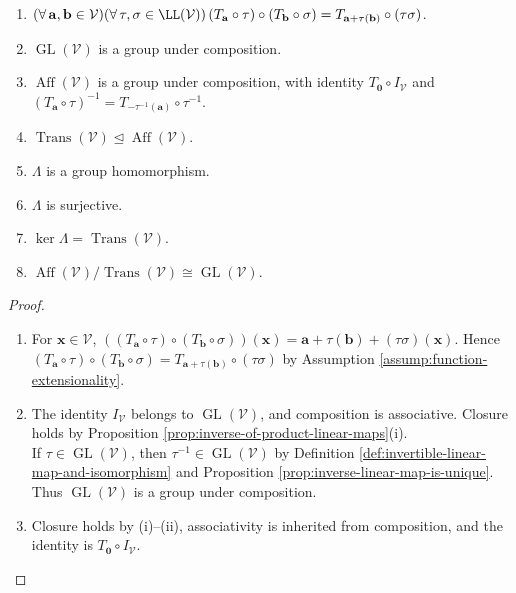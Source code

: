 \begin{theorem} \label{thm:affine-group-linear-part} 
\begin{enumerate}[label=(\roman*)]
\setlength{\itemsep}{0pt}
\item $(\forall\,\mathbf{a},\mathbf{b}\in\mathcal{V})(\forall\,\tau,\sigma\in\LL(\mathcal{V}))\,(T_{\mathbf{a}}\circ\tau)\circ(T_{\mathbf{b}}\circ\sigma)=T_{\mathbf{a}+\tau(\mathbf{b})}\circ(\tau\sigma)$.
\item $\operatorname{GL}(\mathcal{V})$ is a group under composition.
\item $\operatorname{Aff}(\mathcal{V})$ is a group under composition, with identity $T_{\mathbf{0}}\circ I_{\mathcal{V}}$ and $(T_{\mathbf{a}}\circ\tau)^{-1}=T_{-\tau^{-1}(\mathbf{a})}\circ\tau^{-1}$.
\item $\operatorname{Trans}(\mathcal{V})\trianglelefteq\operatorname{Aff}(\mathcal{V})$.
\item $\Lambda$ is a group homomorphism.
\item $\Lambda$ is surjective.
\item $\ker\Lambda=\operatorname{Trans}(\mathcal{V})$.
\item $\operatorname{Aff}(\mathcal{V})/\operatorname{Trans}(\mathcal{V})\cong\operatorname{GL}(\mathcal{V})$.
\end{enumerate}
\begin{proof}
\begin{enumerate}[label=(\roman*)]
\setlength{\itemsep}{0pt}
\item For $\mathbf{x}\in\mathcal{V}$, $((T_{\mathbf{a}}\circ\tau)\circ(T_{\mathbf{b}}\circ\sigma))(\mathbf{x})=\mathbf{a}+\tau(\mathbf{b})+(\tau\sigma)(\mathbf{x})$. Hence $(T_{\mathbf{a}}\circ\tau)\circ(T_{\mathbf{b}}\circ\sigma)=T_{\mathbf{a}+\tau(\mathbf{b})}\circ(\tau\sigma)$ by Assumption \ref{assump:function-extensionality}.
\item The identity $I_{\mathcal{V}}$ belongs to $\operatorname{GL}(\mathcal{V})$, and composition is associative. Closure holds by Proposition \ref{prop:inverse-of-product-linear-maps}(i).\\
If $\tau\in\operatorname{GL}(\mathcal{V})$, then $\tau^{-1}\in\operatorname{GL}(\mathcal{V})$ by Definition \ref{def:invertible-linear-map-and-isomorphism} and Proposition \ref{prop:inverse-linear-map-is-unique}. Thus $\operatorname{GL}(\mathcal{V})$ is a group under composition.
\item Closure holds by (i)--(ii), associativity is inherited from composition, and the identity is $T_{\mathbf{0}}\circ I_{\mathcal{V}}$.\\

\end{enumerate}
\end{proof}
\end{theorem}
